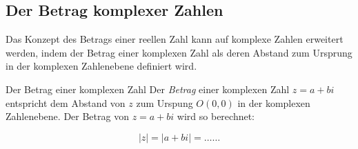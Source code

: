 






































\clearpage
\subsection{Der Betrag komplexer Zahlen}
Das Konzept des Betrags einer reellen Zahl kann auf komplexe Zahlen erweitert werden, indem der Betrag einer komplexen Zahl als deren Abstand zum Ursprung in der komplexen Zahlenebene definiert wird.
\begin{center}
\end{center}

\begin{definition}
    {Der Betrag einer komplexen Zahl}{}
    Der \emph{Betrag} einer komplexen Zahl $z=a+bi$ entspricht dem Abstand von $z$ zum Urspung $O(0, 0)$ in der komplexen Zahlenebene. Der Betrag von $z=a+bi$ wird so berechnet: 

$$|z|=|a+bi|=\ldots\ldots$$

\end{definition}

